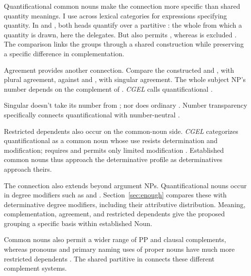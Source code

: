 \documentclass[12pt]{article}
\begin{document}
Quantificational common nouns make the connection more specific than shared quantity meanings. I use  across lexical categories for expressions specifying quantity. In  and , both heads quantify over a partitive : the whole from which a quantity is drawn, here the delegates. But  also permits , whereas  is excluded \citep[349]{huddleston2002}. The comparison links the groups through a shared construction while preserving a specific difference in complementation.

Agreement provides another connection. Compare the constructed  and , with plural agreement, against  and , with singular agreement. The whole subject NP's number depends on the complement of . \textit{CGEL} calls quantificational   \citep[349--350, 411--412]{huddleston2002}.

Singular  doesn't take its number from ; nor does ordinary . Number transparency specifically connects quantificational  with number-neutral .

Restricted dependents also occur on the common-noun side. \textit{CGEL} categorizes quantificational  as a common noun whose use resists determination and modification;  requires  and permits only limited modification \citep[349--350]{huddleston2002}. Established common nouns thus approach the determinative profile as determinatives approach theirs.

The connection also extends beyond argument NPs. Quantificational nouns occur in degree modifiers such as  and  \citep[549--550]{huddleston2002}. Section~\ref{sec:enough} compares these with determinative degree modifiers, including their attributive distribution. Meaning, complementation, agreement, and restricted dependents give the proposed grouping a specific basis within established Noun.

Common nouns also permit a wider range of PP and clausal complements, whereas pronouns and primary naming uses of proper nouns have much more restricted dependents \citep[429--430, 439--443, 517--521]{huddleston2002}. The shared partitive in  connects these different complement systems.
\end{document}
